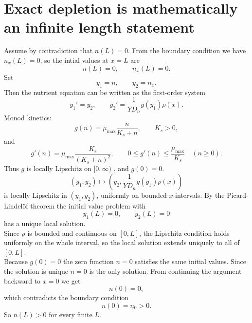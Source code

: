 \documentclass[11pt,a4paper]{report}
\begin{document}
	\section{Exact depletion is mathematically an infinite length statement}
	\label{sec:n0}
	Assume by contradiction that $n(L)=0$. From the boundary condition we have
	$n_x(L)=0$, so the intial values at $x=L$ are
	\[
	n(L)=0,
	\qquad
	n_x(L)=0.
	\]
	Set
	\[
	y_1=n,
	\qquad
	y_2=n_x.
	\]
	Then the nutrient equation can be written as the first-order system
	\[
	y_1'=y_2,
	\qquad
	y_2'=\frac{1}{YD_n}g(y_1)\rho(x).
	\]
	Monod kinetics:
	\[
	g(n)=\mu_{\max}\frac{n}{K_s+n},
	\qquad K_s>0,
	\]
	and
	\[
	g'(n)
	=
	\mu_{\max}\frac{K_s}{(K_s+n)^2},
	\qquad
	0\le g'(n)\le \frac{\mu_{\max}}{K_s}
	\quad (n\ge0).
	\]
	Thus $g$ is locally Lipschitz on $[0,\infty)$ \cite{dgl}, and $g(0)=0$.
	\[
	(y_1,y_2)\mapsto
	\left(
	y_2,
	\frac{1}{YD_n}g(y_1)\rho(x)
	\right)
	\]
	is locally Lipschitz in $(y_1,y_2)$, uniformly on bounded $x$-intervals.
	By the Picard-Lindelöf theorem \cite{dgl} the initial value problem with
	\[
	y_1(L)=0,
	\qquad
	y_2(L)=0
	\]
	has a unique local solution.\\
	Since $\rho$
	is bounded and continuous on $[0,L]$, the Lipschitz condition holds uniformly on the whole interval, so the local solution extends uniquely to all of $[0,L]$.\\
	Because $g(0)=0$ the zero function $n=0$ satisfies the
	same initial values. Since the solution is unique 
	$n=0$ is the only solution. From continuing the argument backward
	to $x=0$ we get
	\[
	n(0)=0,
	\]
	which contradicts the boundary condition
	\[
	n(0)=n_0>0.
	\]
	So $n(L)>0$ for every finite $L$.
\end{document}
